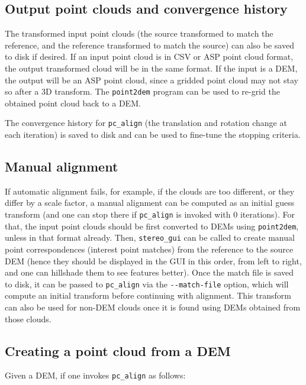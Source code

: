 \subsection{Output point clouds and convergence history}

The transformed input point clouds (the source transformed to match the
reference, and the reference transformed to match the source) can also
be saved to disk if desired. If an input point cloud is in CSV or ASP
point cloud format, the output transformed cloud will be in the same
format. If the input is a DEM, the output will be an ASP point cloud,
since a gridded point cloud may not stay so after a 3D transform. The
\texttt{point2dem} program can be used to re-grid the obtained point
cloud back to a DEM.

The convergence history for \texttt{pc\_align} (the translation and
rotation change at each iteration) is saved to disk and can be used to
fine-tune the stopping criteria.

\subsection{Manual alignment}
\label{manual-align}

If automatic alignment fails, for example, if the clouds are too
different, or they differ by a scale factor, a manual alignment can be
computed as an initial guess transform (and one can stop there if
\texttt{pc\_align} is invoked with 0 iterations). For that, the input
point clouds should be first converted to DEMs using \texttt{point2dem},
unless in that format already. Then, \texttt{stereo\_gui} can be called
to create manual point correspondences (interest point matches) from the
reference to the source DEM (hence they should be displayed in the GUI
in this order, from left to right, and one can hillshade them to see
features better). Once the match file is saved to disk, it can be passed
to \texttt{pc\_align} via the \texttt{-\/-match-file} option, which will
compute an initial transform before continuing with alignment. This
transform can also be used for non-DEM clouds once it is found using
DEMs obtained from those clouds.

\subsection{Creating a point cloud from a DEM}
\label{regrid}

Given a DEM, if one invokes \texttt{pc\_align} as follows:

